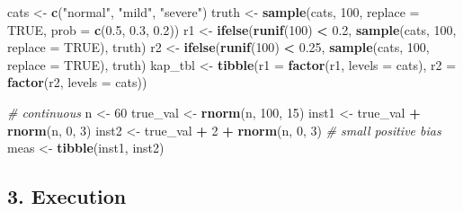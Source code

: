 \documentclass[
]{article}
\newenvironment{Shaded}{\begin{snugshade}}{\end{snugshade}}
\newcommand{\AttributeTok}[1]{\textcolor[rgb]{0.13,0.29,0.53}{#1}}
\newcommand{\CommentTok}[1]{\textcolor[rgb]{0.56,0.35,0.01}{\textit{#1}}}
\newcommand{\ConstantTok}[1]{\textcolor[rgb]{0.56,0.35,0.01}{#1}}
\newcommand{\DecValTok}[1]{\textcolor[rgb]{0.00,0.00,0.81}{#1}}
\newcommand{\FloatTok}[1]{\textcolor[rgb]{0.00,0.00,0.81}{#1}}
\newcommand{\FunctionTok}[1]{\textcolor[rgb]{0.13,0.29,0.53}{\textbf{#1}}}
\newcommand{\NormalTok}[1]{#1}
\newcommand{\OtherTok}[1]{\textcolor[rgb]{0.56,0.35,0.01}{#1}}
\newcommand{\SpecialCharTok}[1]{\textcolor[rgb]{0.81,0.36,0.00}{\textbf{#1}}}
\newcommand{\StringTok}[1]{\textcolor[rgb]{0.31,0.60,0.02}{#1}}
\begin{document}
\begin{Shaded}
\begin{Highlighting}[]
\NormalTok{cats }\OtherTok{\textless{}{-}} \FunctionTok{c}\NormalTok{(}\StringTok{"normal"}\NormalTok{, }\StringTok{"mild"}\NormalTok{, }\StringTok{"severe"}\NormalTok{)}
\NormalTok{truth }\OtherTok{\textless{}{-}} \FunctionTok{sample}\NormalTok{(cats, }\DecValTok{100}\NormalTok{, }\AttributeTok{replace =} \ConstantTok{TRUE}\NormalTok{, }\AttributeTok{prob =} \FunctionTok{c}\NormalTok{(}\FloatTok{0.5}\NormalTok{, }\FloatTok{0.3}\NormalTok{, }\FloatTok{0.2}\NormalTok{))}
\NormalTok{r1 }\OtherTok{\textless{}{-}} \FunctionTok{ifelse}\NormalTok{(}\FunctionTok{runif}\NormalTok{(}\DecValTok{100}\NormalTok{) }\SpecialCharTok{\textless{}} \FloatTok{0.2}\NormalTok{, }\FunctionTok{sample}\NormalTok{(cats, }\DecValTok{100}\NormalTok{, }\AttributeTok{replace =} \ConstantTok{TRUE}\NormalTok{), truth)}
\NormalTok{r2 }\OtherTok{\textless{}{-}} \FunctionTok{ifelse}\NormalTok{(}\FunctionTok{runif}\NormalTok{(}\DecValTok{100}\NormalTok{) }\SpecialCharTok{\textless{}} \FloatTok{0.25}\NormalTok{, }\FunctionTok{sample}\NormalTok{(cats, }\DecValTok{100}\NormalTok{, }\AttributeTok{replace =} \ConstantTok{TRUE}\NormalTok{), truth)}
\NormalTok{kap\_tbl }\OtherTok{\textless{}{-}} \FunctionTok{tibble}\NormalTok{(}\AttributeTok{r1 =} \FunctionTok{factor}\NormalTok{(r1, }\AttributeTok{levels =}\NormalTok{ cats),}
                  \AttributeTok{r2 =} \FunctionTok{factor}\NormalTok{(r2, }\AttributeTok{levels =}\NormalTok{ cats))}

\CommentTok{\# continuous}
\NormalTok{n }\OtherTok{\textless{}{-}} \DecValTok{60}
\NormalTok{true\_val }\OtherTok{\textless{}{-}} \FunctionTok{rnorm}\NormalTok{(n, }\DecValTok{100}\NormalTok{, }\DecValTok{15}\NormalTok{)}
\NormalTok{inst1 }\OtherTok{\textless{}{-}}\NormalTok{ true\_val }\SpecialCharTok{+} \FunctionTok{rnorm}\NormalTok{(n, }\DecValTok{0}\NormalTok{, }\DecValTok{3}\NormalTok{)}
\NormalTok{inst2 }\OtherTok{\textless{}{-}}\NormalTok{ true\_val }\SpecialCharTok{+} \DecValTok{2} \SpecialCharTok{+} \FunctionTok{rnorm}\NormalTok{(n, }\DecValTok{0}\NormalTok{, }\DecValTok{3}\NormalTok{)    }\CommentTok{\# small positive bias}
\NormalTok{meas }\OtherTok{\textless{}{-}} \FunctionTok{tibble}\NormalTok{(inst1, inst2)}
\end{Highlighting}
\end{Shaded}

\subsection{3. Execution}\label{execution}
\end{document}
